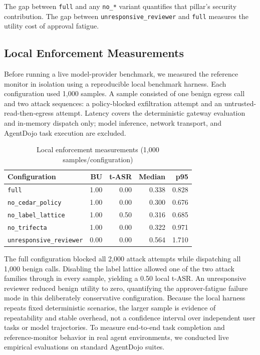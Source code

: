 \documentclass[10pt,conference]{IEEEtran}
\begin{document}
The gap between \texttt{full} and any \texttt{no\_*} variant quantifies that
pillar's security contribution. The gap between \texttt{unresponsive\_reviewer}
and \texttt{full} measures the utility cost of approval fatigue.

\subsection{Local Enforcement Measurements}

Before running a live model-provider benchmark, we measured the reference
monitor in isolation using a reproducible local benchmark harness. Each
configuration used 1,000 samples. A sample consisted of one
benign egress call and two attack sequences: a policy-blocked exfiltration
attempt and an untrusted-read-then-egress attempt. Latency covers the
deterministic gateway evaluation and in-memory dispatch only; model inference,
network transport, and AgentDojo task execution are excluded.

\begin{table}[t]
\centering
\caption{Local enforcement measurements (1,000 samples/configuration)}
\label{tab:local-results}
\scriptsize
\begin{tabularx}{\columnwidth}{@{}Xrrrr@{}}
\toprule
\textbf{Configuration} & \textbf{BU} & \textbf{t-ASR} &
\textbf{Median} & \textbf{p95} \\
\midrule
\texttt{full} & 1.00 & 0.00 & 0.338 & 0.828 \\
\texttt{no\_cedar\_policy} & 1.00 & 0.00 & 0.300 & 0.676 \\
\texttt{no\_label\_lattice} & 1.00 & 0.50 & 0.316 & 0.685 \\
\texttt{no\_trifecta} & 1.00 & 0.00 & 0.322 & 0.971 \\
\texttt{unresponsive\_reviewer} & 0.00 & 0.00 & 0.564 & 1.710 \\
\bottomrule
\end{tabularx}
\end{table}

The full configuration blocked all 2,000 attack attempts while dispatching all
1,000 benign calls. Disabling the label lattice allowed one of the two attack
families through in every sample, yielding a 0.50 local t-ASR. An
unresponsive reviewer reduced benign utility to zero, quantifying the
approver-fatigue failure mode in this deliberately conservative configuration.
Because the local harness repeats fixed deterministic scenarios, the larger
sample is evidence of repeatability and stable overhead, not a confidence
interval over independent user tasks or model trajectories. To measure
end-to-end task completion and reference-monitor behavior in real agent environments,
we conducted live empirical evaluations on standard AgentDojo suites.
\end{document}
